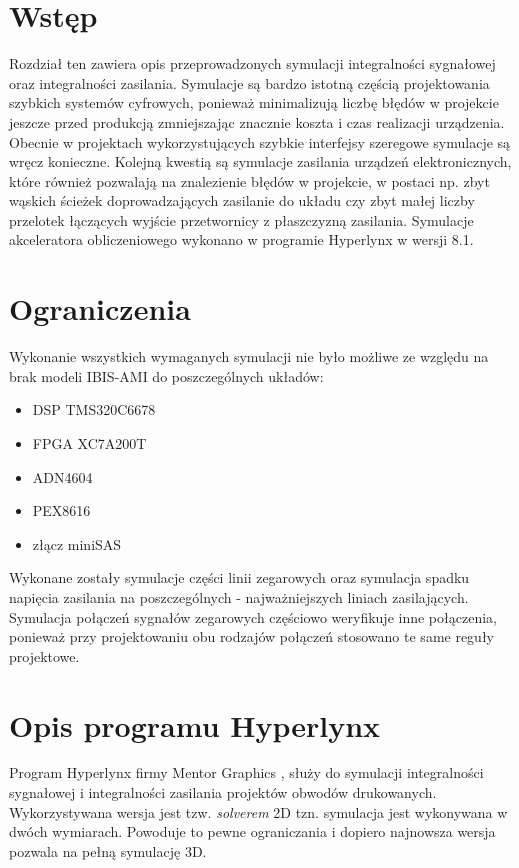 \section{Wstęp}
Rozdział ten zawiera opis przeprowadzonych symulacji integralności sygnałowej oraz integralności zasilania.  Symulacje są bardzo istotną częścią projektowania szybkich systemów cyfrowych, ponieważ minimalizują liczbę błędów w projekcie jeszcze przed produkcją zmniejszając znacznie koszta i czas realizacji urządzenia. Obecnie w projektach wykorzystujących szybkie interfejsy szeregowe symulacje są wręcz konieczne. Kolejną kwestią są symulacje zasilania urządzeń elektronicznych, które również pozwalają na znalezienie błędów w projekcie, w postaci np. zbyt wąskich ścieżek doprowadzających zasilanie do układu czy zbyt małej liczby przelotek łączących wyjście przetwornicy z płaszczyzną zasilania. Symulacje akceleratora obliczeniowego wykonano w programie Hyperlynx \cite{HYPERLYNX} w wersji 8.1.

\section{Ograniczenia}
Wykonanie wszystkich wymaganych symulacji nie było możliwe ze względu na brak modeli IBIS-AMI do poszczególnych układów: 
\begin{itemize}
\item DSP TMS320C6678
\item FPGA XC7A200T
\item ADN4604
\item PEX8616
\item złącz miniSAS
\end{itemize}

Wykonane zostały symulacje części linii zegarowych oraz symulacja spadku napięcia zasilania na poszczególnych - najważniejszych liniach zasilających. Symulacja połączeń sygnałów zegarowych częściowo weryfikuje inne połączenia, ponieważ przy projektowaniu obu rodzajów połączeń stosowano te same reguły projektowe. 

\section{Opis programu Hyperlynx}
Program Hyperlynx firmy Mentor Graphics \cite{MENTOR}, służy do symulacji integralności sygnałowej i integralności zasilania projektów obwodów drukowanych. Wykorzystywana wersja jest tzw. \textit{solverem} 2D tzn. symulacja jest wykonywana w dwóch wymiarach. Powoduje to pewne ograniczania i dopiero najnowsza wersja pozwala na pełną symulację 3D. 


